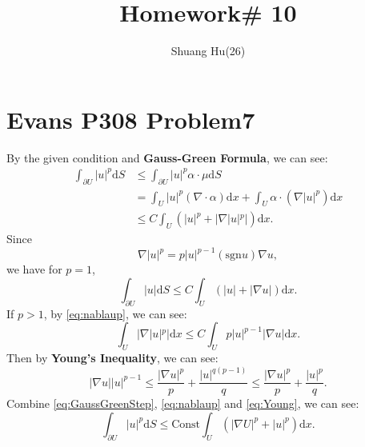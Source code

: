 \documentclass[a4paper]{ctexart}
\title{Homework\# 10}
\author{Shuang Hu(26)}
\newcommand{\dif}{\mathrm{d}}
\begin{document}
\maketitle
\section*{Evans P308 Problem7}
By the given condition and \textbf{Gauss-Green Formula}, we can see:
\begin{equation}
    \label{eq:GaussGreenStep}
    \begin{aligned}
        \int_{\partial U}|u|^{p}\dif S&\le\int_{\partial U}|u|^{p}\alpha\cdot\mu\dif S\\
        &=\int_{U}|u|^{p}(\nabla\cdot\alpha)\dif x+\int_{U}\alpha\cdot(\nabla|u|^{p})\dif x\\
        &\le C\int_{U}(|u|^{p}+|\nabla|u|^{p}|)\dif x.
    \end{aligned}
\end{equation}
Since 
\begin{equation}
    \label{eq:nablaup}
    \nabla|u|^{p}=p|u|^{p-1}(\text{sgn}u)\nabla u,
\end{equation}
we have for $p=1$, 
\begin{equation}
    \int_{\partial U}|u|\dif S\le C\int_{U}(|u|+|\nabla u|)\dif x.
\end{equation}
If $p>1$, by \eqref{eq:nablaup}, we can see:
\begin{equation}
    \label{eq:approximateInt}
    \int_{U}|\nabla|u|^{p}|\dif x\le C\int_{U}p|u|^{p-1}|\nabla u|\dif x.
\end{equation}
Then by \textbf{Young's Inequality}, we can see:
\begin{equation}
    \label{eq:Young}
    |\nabla u||u|^{p-1}\le\frac{|\nabla u|^{p}}{p}+\frac{|u|^{q(p-1)}}{q}
    \le \frac{|\nabla u|^{p}}{p}+\frac{|u|^{p}}{q}.
\end{equation}
Combine \eqref{eq:GaussGreenStep}, \eqref{eq:nablaup} and \eqref{eq:Young}, we can see:
\begin{equation}
    \int_{\partial U}|u|^{p}\dif S\le \text{Const}\int_{U}(|\nabla U|^{p}+|u|^{p})\dif x.
\end{equation}
\end{document}
